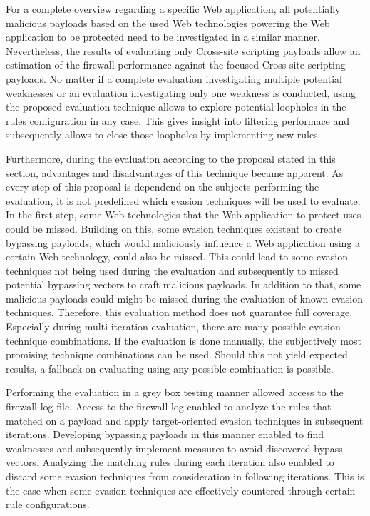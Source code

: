 For a complete overview regarding a specific Web application, all potentially malicious payloads based on the used Web technologies powering the Web application to be protected need to be investigated in a similar manner. Nevertheless, the results of evaluating only Cross-site scripting payloads allow an estimation of the firewall performance against the focused Cross-site scripting payloads. No matter if a complete evaluation investigating multiple potential weaknesses or an evaluation investigating only one weakness is conducted, using the proposed evaluation technique allows to explore potential loopholes in the rules configuration in any case. This gives insight into filtering performace and subsequently allows to close those loopholes by implementing new rules.

Furthermore, during the evaluation according to the proposal stated in this section, advantages and disadvantages of this technique became apparent. As every step of this proposal is dependend on the subjects performing the evaluation, it is not predefined which evasion techniques will be used to evaluate. In the first step, some Web technologies that the Web application to protect uses could be missed. Building on this, some evasion techniques existent to create bypassing payloads, which would maliciously influence a Web application using a certain Web technology, could also be missed. 
This could lead to some evasion techniques not being used during the evaluation and subsequently to missed potential bypassing vectors to craft malicious payloads. In addition to that, some malicious payloads could might be missed during the evaluation of known evasion techniques. 
Therefore, this evaluation method does not guarantee full coverage. 
Especially during multi-iteration-evaluation, there are many possible evasion technique combinations. If the evaluation is done manually, the subjectively most promising technique combinations can be used. Should this not yield expected results, a fallback on evaluating using any possible combination is possible.

Performing the evaluation in a grey box testing manner allowed access to the firewall log file. Access to the firewall log enabled to analyze the rules that matched on a payload and apply target-oriented evasion techniques in subsequent iterations. Developing bypassing payloads in this manner enabled to find weaknesses and subsequently implement measures to avoid discovered bypass vectors. Analyzing the matching rules during each iteration also enabled to discard some evasion techniques from consideration in following iterations. This is the case when some evasion techniques are effectively countered through certain rule configurations. 

